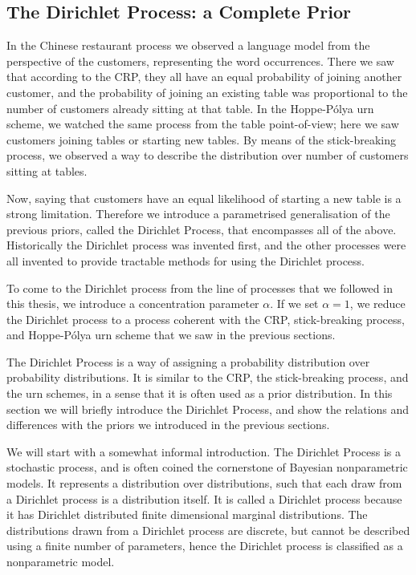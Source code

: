 
%


\subsection{The Dirichlet Process: a Complete Prior}
In the Chinese restaurant process we observed a language model from the perspective of the customers, representing the word occurrences. There we saw that according to the CRP, they all have an equal probability of joining another customer, and the probability of joining an existing table was proportional to the number of customers already sitting at that table. In the Hoppe-P\'olya urn scheme, we watched the same process from the table point-of-view; here we saw customers joining tables or starting new tables. By means of the stick-breaking process, we observed a way to describe the distribution over number of customers sitting at tables.

Now, saying that customers have an equal likelihood of starting a new table is a strong limitation. Therefore we introduce a parametrised generalisation of the previous priors, called the Dirichlet Process, that encompasses all of the above. Historically the Dirichlet process was invented first, and the other processes were all invented to provide tractable methods for using the Dirichlet process. 

To come to the Dirichlet process from the line of processes that we followed in this thesis, we introduce a concentration parameter $\alpha $. If we set $\alpha = 1$, we reduce the Dirichlet process to a process coherent with the CRP, stick-breaking process, and Hoppe-P\'olya urn scheme that we saw in the previous sections.  

The Dirichlet Process is a way of assigning a probability distribution over probability distributions. It is similar to the CRP, the stick-breaking process, and the urn schemes, in a sense that it is often used as a prior distribution. In this section we will briefly introduce the Dirichlet Process, and show the relations and differences with the priors we introduced in the previous sections.

We will start with a somewhat informal introduction. The Dirichlet Process is a stochastic process, and is often coined the cornerstone of Bayesian nonparametric models. It represents a distribution over distributions, such that each draw from a Dirichlet process is a distribution itself. It is called a Dirichlet process because it has Dirichlet distributed finite dimensional marginal distributions. The distributions drawn from a Dirichlet process are discrete, but cannot be described using a finite number of parameters, hence the Dirichlet process is classified as a nonparametric model.

